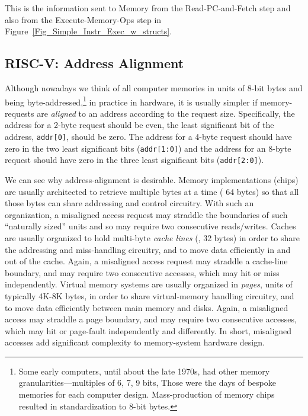 This is the information sent to Memory from the Read-PC-and-Fetch step
and also from the Execute-Memory-Ops step in
Figure~\ref{Fig_Simple_Instr_Exec_w_structs}.


\subsection{RISC-V: Address Alignment}


Although nowadays we think of all computer memories in units of 8-bit
bytes and being byte-addressed,\footnote{Some early computers, until
about the late 1970s, had other memory granularities---multiples of 6,
7, 9 bits, {\etc} Those were the days of bespoke memories for each
computer design.  Mass-production of memory chips resulted in
standardization to 8-bit bytes.} in practice in hardware, it is
usually simpler if memory-requests are \emph{aligned} to an address
according to the request size.  Specifically, the address for a 2-byte
request should be even, {\ie} the least significant bit of the
address, \verb|addr[0]|, should be zero.  The address for a 4-byte
request should have zero in the two least significant bits
(\verb|addr[1:0]|) and the address for an 8-byte request should have
zero in the three least significant bits (\verb|addr[2:0]|).

We can see why address-alignment is desirable.  Memory implementations
(chips) are usually architected to retrieve multiple bytes at a time
({\eg} 64 bytes) so that all those bytes can share addressing and
control circuitry.  With such an organization, a misaligned access
request may straddle the boundaries of such ``naturally sized'' units
and so may require two consecutive reads/writes.  Caches are usually
organized to hold multi-byte \emph{cache lines} ({\eg}, 32 bytes) in
order to share the addressing and miss-handling circuitry, and to move
data efficiently in and out of the cache.  Again, a misaligned access
request may straddle a cache-line boundary, and may require two
consecutive accesses, which may hit or miss independently.  Virtual
memory systems are usually organized in \emph{pages}, units of
typically 4K-8K bytes, in order to share virtual-memory handling
circuitry, and to move data efficiently between main memory and disks.
Again, a misaligned access may straddle a page boundary, and may
require two consecutive accesses, which may hit or page-fault
independently and differently.  In short, misaligned accesses add
significant complexity to memory-system hardware design.


